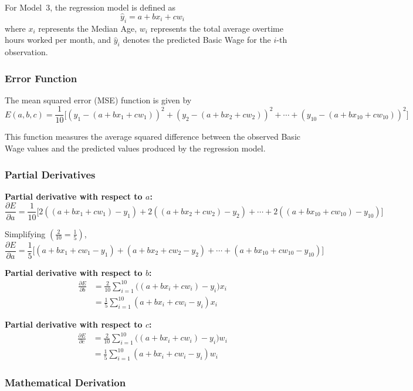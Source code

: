 \documentclass[12pt,a4paper,oneside]{report}
\begin{document}
For Model~3, the regression model is defined as
\[
\hat{y}_i = a + b x_i + c w_i
\]
where $x_i$ represents the Median Age, $w_i$ represents the total average overtime
hours worked per month, and $\hat{y}_i$ denotes the predicted Basic Wage for the
$i$-th observation.

\subsubsection*{Error Function}

The mean squared error (MSE) function is given by
\[
E(a,b,c)
= \frac{1}{10}
\Big[
(y_1 - (a + b x_1 + c w_1))^2
+ (y_2 - (a + b x_2 + c w_2))^2
+ \cdots
+ (y_{10} - (a + b x_{10} + c w_{10}))^2
\Big]
\]

This function measures the average squared difference between the observed Basic
Wage values and the predicted values produced by the regression model.

\subsubsection*{Partial Derivatives}

\textbf{Partial derivative with respect to $a$:}
\[
\frac{\partial E}{\partial a}
= \frac{1}{10}
\Big[
2((a + b x_1 + c w_1) - y_1)
+ 2((a + b x_2 + c w_2) - y_2)
+ \cdots
+ 2((a + b x_{10} + c w_{10}) - y_{10})
\Big]
\]

Simplifying $\left( \frac{2}{10} = \frac{1}{5} \right)$,
\[
\frac{\partial E}{\partial a}
= \frac{1}{5}
\Big[
(a + b x_1 + c w_1 - y_1)
+ (a + b x_2 + c w_2 - y_2)
+ \cdots
+ (a + b x_{10} + c w_{10} - y_{10})
\Big]
\]

\textbf{Partial derivative with respect to $b$:}
\[
\begin{aligned}
\frac{\partial E}{\partial b}
&= \frac{2}{10}\sum_{i=1}^{10}
\big((a + b x_i + c w_i) - y_i\big)x_i \\
&= \frac{1}{5}\sum_{i=1}^{10}
(a + b x_i + c w_i - y_i)x_i
\end{aligned}
\]

\textbf{Partial derivative with respect to $c$:}
\[
\begin{aligned}
\frac{\partial E}{\partial c}
&= \frac{2}{10}\sum_{i=1}^{10}
\big((a + b x_i + c w_i) - y_i\big)w_i \\
&= \frac{1}{5}\sum_{i=1}^{10}
(a + b x_i + c w_i - y_i)w_i
\end{aligned}
\]

\subsubsection*{Mathematical Derivation}
\end{document}
